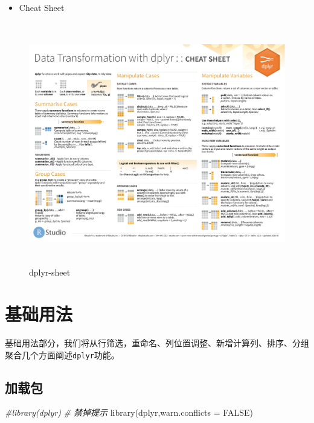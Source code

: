 \documentclass[
]{book}
\newenvironment{Shaded}{\begin{snugshade}}{\end{snugshade}}
\newcommand{\AttributeTok}[1]{\textcolor[rgb]{0.77,0.63,0.00}{#1}}
\newcommand{\CommentTok}[1]{\textcolor[rgb]{0.56,0.35,0.01}{\textit{#1}}}
\newcommand{\ConstantTok}[1]{\textcolor[rgb]{0.00,0.00,0.00}{#1}}
\newcommand{\FunctionTok}[1]{\textcolor[rgb]{0.00,0.00,0.00}{#1}}
\newcommand{\NormalTok}[1]{#1}
\providecommand{\tightlist}{%
  \setlength{\itemsep}{0pt}\setlength{\parskip}{0pt}}
\begin{document}
\begin{itemize}
\tightlist
\item
  Cheat Sheet
\end{itemize}

\begin{figure}
\centering
\includegraphics[width=1\textwidth,height=4.16667in]{./picture/dplyr/data-transformation.pdf}
\caption{dplyr-sheet}
\end{figure}

\hypertarget{ux57faux7840ux7528ux6cd5-2}{%
\section{基础用法}\label{ux57faux7840ux7528ux6cd5-2}}

基础用法部分，我们将从行筛选，重命名、列位置调整、新增计算列、排序、分组聚合几个方面阐述\texttt{dplyr}功能。

\hypertarget{ux52a0ux8f7dux5305}{%
\subsection{加载包}\label{ux52a0ux8f7dux5305}}

\begin{Shaded}
\begin{Highlighting}[]
\CommentTok{\#library(dplyr)}
\CommentTok{\# 禁掉提示}
\FunctionTok{library}\NormalTok{(dplyr,}\AttributeTok{warn.conflicts =} \ConstantTok{FALSE}\NormalTok{)}
\end{Highlighting}
\end{Shaded}
\end{document}
